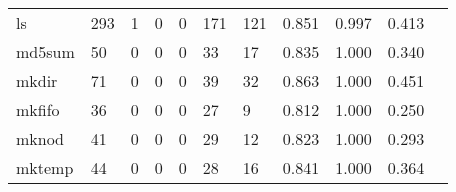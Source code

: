 \begin{longtable}{lp{1.2cm}p{1.2cm}p{1.2cm}p{1.2cm}p{1.2cm}p{1.2cm}p{1.2cm}p{1.2cm}p{1.2cm}p{1.2cm}}
ls        &                                   293 &                                                  1 &                                                  0 &                                                  0 &                                                171 &                                                121 &                                              0.851 &                                              0.997 &                                              0.413 \\
md5sum    &                                    50 &                                                  0 &                                                  0 &                                                  0 &                                                 33 &                                                 17 &                                              0.835 &                                              1.000 &                                              0.340 \\
mkdir     &                                    71 &                                                  0 &                                                  0 &                                                  0 &                                                 39 &                                                 32 &                                              0.863 &                                              1.000 &                                              0.451 \\
mkfifo    &                                    36 &                                                  0 &                                                  0 &                                                  0 &                                                 27 &                                                  9 &                                              0.812 &                                              1.000 &                                              0.250 \\
mknod     &                                    41 &                                                  0 &                                                  0 &                                                  0 &                                                 29 &                                                 12 &                                              0.823 &                                              1.000 &                                              0.293 \\
mktemp    &                                    44 &                                                  0 &                                                  0 &                                                  0 &                                                 28 &                                                 16 &                                              0.841 &                                              1.000 &                                              0.364 \\

\end{longtable}
